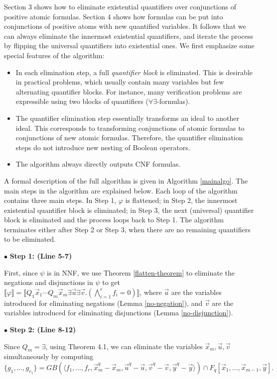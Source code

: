 \documentclass[envcountsect]{llncs}
\begin{document}
Section 3 shows how to eliminate existential quantifiers over conjunctions of positive atomic formulas. Section 4 shows how formulas can be put into conjunctions of positive atoms with new quantified variables. It follows that we can always eliminate the innermost existential quantifiers, and iterate the process by flipping the universal quantifiers into existential ones. We first emphasize some special features of the algorithm:
\begin{itemize}
\item In each elimination step, a full {\em quantifier block} is eliminated. This is desirable in practical problems, which usually contain many variables but few alternating quantifier blocks. For instance, many verification problems are expressible using two blocks of quantifiers ($\forall\exists$-formulas). 
\item The quantifier elimination step essentially transforms an ideal to another ideal. This corresponds to transforming conjunctions of atomic formulas to conjunctions of new atomic formulas. Therefore, the quantifier elimination steps do not introduce new nesting of Boolean operators.
\item The algorithm always directly outputs CNF formulas.
\end{itemize}

A formal description of the full algorithm is given in Algorithm \ref{mainalgo}. The main steps in the algorithm are explained below. Each loop of the algorithm contains three main steps. In Step 1, $\varphi$ is flattened; in Step 2, the innermost existential quantifier block is eliminated; in Step 3, the next (universal) quantifier block is eliminated and the process loops back to Step 1. The algorithm terminates either after Step 2 or Step 3, when there are no remaining quantifiers to be eliminated.

$\bullet$ {\bf Step 1: (Line 5-7)} 

First, since $\psi$ is in NNF, we use Theorem \ref{flatten-theorem} to eliminate the negations and disjunctions in $\psi$ to get $\llbracket\varphi\rrbracket=\llbracket Q_1\vec x_1\cdots Q_m\vec x_m \exists \vec u\exists \vec v. (\bigwedge_{i=1}^{r} f_i=0)\rrbracket$, where $\vec u$ are the variables introduced for eliminating negations (Lemma \ref{no-negation}), and $\vec v$ are the variables introduced for eliminating disjunctions (Lemma \ref{no-disjunction}).


$\bullet$ {\bf Step 2: (Line 8-12)}

Since $Q_m=\exists$, using Theorem 4.1, we can eliminate the variables $\vec x_m, \vec u, \vec v$ simultaneously by computing $$\{g_1,...,g_{r_1}\} = GB(\langle f_1,...,f_r, \vec x_m^q-\vec x_m, \vec u^q-\vec u, \vec v^q-\vec v, \vec y^q-\vec y\rangle)\cap F_q[\vec x_1,...,\vec x_{m-1}, \vec y].$$ 
\end{document}
